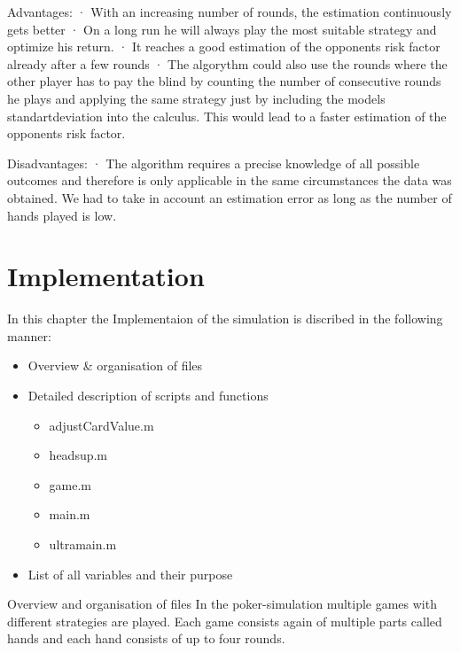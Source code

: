 \documentclass[11pt]{article}
\begin{document}
Advantages:
·         With an increasing number of rounds, the estimation continuously gets better
·          On a long run he will always play the most suitable strategy and optimize his return.
·         It reaches a good estimation of the opponents risk factor already after a few rounds
·         The algorythm could also use the rounds where the other player has to pay the blind by counting the number of consecutive rounds he plays and applying the same strategy just by including the models standartdeviation into the calculus. This would lead to a faster estimation of the opponents risk factor.
 
Disadvantages:
·         The algorithm requires a precise knowledge of all possible outcomes and therefore is only applicable in the same circumstances the data was obtained.
We had to take in account an estimation error as long as the number of hands played is low.








\section{Implementation}
In this chapter the Implementaion of the simulation is discribed in the following manner:
\begin{itemize}
\item Overview \& organisation of files
\item Detailed description of scripts and functions
    \begin{itemize}
    	\item adjustCardValue.m
        \item headsup.m
        \item game.m
        \item main.m
        \item ultramain.m
    \end{itemize}
\item List of all variables and their purpose
\end{itemize}

Overview and organisation of files 
In the poker-simulation multiple games with different strategies are played. Each game consists again of multiple parts called hands and each hand consists of up to four rounds.
\end{document}
